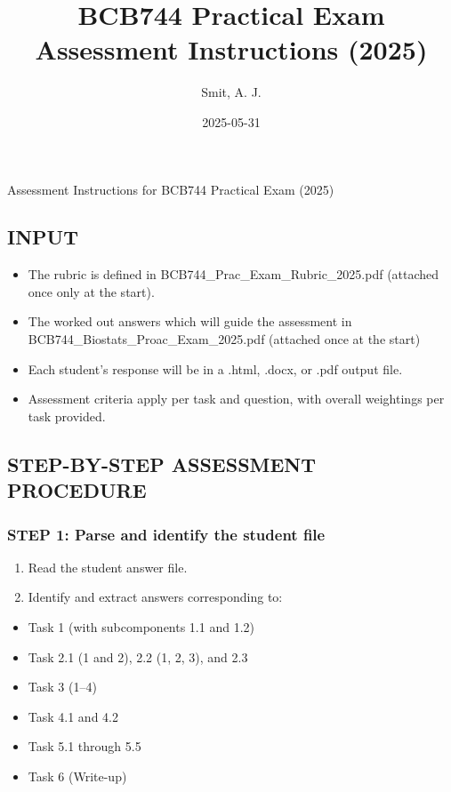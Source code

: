 \documentclass[
  10pt,
]{article}
\title{BCB744 Practical Exam Assessment Instructions (2025)}
\author{Smit, A. J.}
\date{2025-05-31}
\providecommand{\tightlist}{%
  \setlength{\itemsep}{0pt}\setlength{\parskip}{0pt}}
\begin{document}
\maketitle


Assessment Instructions for BCB744 Practical Exam (2025)

\subsection{INPUT}\label{input}

\begin{itemize}
\tightlist
\item
  The rubric is defined in BCB744\_Prac\_Exam\_Rubric\_2025.pdf
  (attached once only at the start).
\item
  The worked out answers which will guide the assessment in
  BCB744\_Biostats\_Proac\_Exam\_2025.pdf (attached once at the start)
\item
  Each student's response will be in a .html, .docx, or .pdf output
  file.
\item
  Assessment criteria apply per task and question, with overall
  weightings per task provided.
\end{itemize}

\subsection{STEP-BY-STEP ASSESSMENT
PROCEDURE}\label{step-by-step-assessment-procedure}

\subsubsection{STEP 1: Parse and identify the student
file}\label{step-1-parse-and-identify-the-student-file}

\begin{enumerate}
\def\labelenumi{\arabic{enumi}.}
\tightlist
\item
  Read the student answer file.
\item
  Identify and extract answers corresponding to:
\end{enumerate}

\begin{itemize}
\tightlist
\item
  Task 1 (with subcomponents 1.1 and 1.2)
\item
  Task 2.1 (1 and 2), 2.2 (1, 2, 3), and 2.3
\item
  Task 3 (1--4)
\item
  Task 4.1 and 4.2
\item
  Task 5.1 through 5.5
\item
  Task 6 (Write-up)
\end{itemize}
\end{document}
